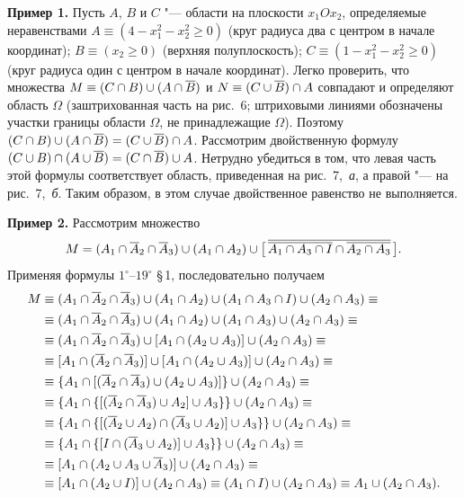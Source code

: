 {\small
\noindent\textbf{Пример 1.} Пусть $A$, $B$ и $C$ "--- области на
плоскости $x_1Ox_2$, определяемые неравенствами
$A\equiv(4-x_1^2-x_2^2\ge0)$ (круг радиуса два с центром в начале
координат); $B\equiv(x_2\ge0)$ (верхняя полуплоскость);
$C\equiv(1-x_1^2-x_2^2\ge0)$ (круг радиуса один с центром в начале
координат). Легко проверить, что множества
$M\equiv(C\cap B)\cup(A\cap\overline{B})$ и $N\equiv(C\cup\overline{B})\cap A$ совпадают
и определяют область $\Omega$ (заштрихованная часть на рис.~6;
штриховыми линиями обозначены участки границы области $\Omega$, не
принадлежащие $\Omega$). Поэтому $(C\cap B)\cup(A\cap\overline{B})=(C\cup\overline{B})\cap A$.
Рассмотрим двойственную формулу $(C\cup B)\cap(A\cup\overline{B})=(C\cap\overline{B})\cup A$.
Нетрудно убедиться в том, что левая часть этой формулы соответствует
область, приведенная на рис.~7,~\emph{а}, а правой "--- на рис.~7,~\emph{б}.
Таким образом, в этом случае двойственное равенство не выполняется.

\smallskip
\noindent\textbf{Пример 2.} Рассмотрим множество
\[
M=(A_1\cap\overline{A}_2\cap\overline{A}_3)\cup(A_1\cap A_2)\cup
\bigl[\,\overline{\overline{A_1\cap A_3\cap I}\cap\overline{A_2\cap A_3}}\,\bigr].
\]
Применяя формулы $1^\circ$--$19^\circ$ \S\,1, последовательно получаем
\begin{align*}
M&\equiv(A_1\cap\overline{A}_2\cap\overline{A}_3)\cup(A_1\cap A_2)\cup(A_1\cap A_3\cap I)\cup(A_2\cap A_3)\equiv\\
&\equiv(A_1\cap\overline{A}_2\cap\overline{A}_3)\cup(A_1\cap A_2)\cup(A_1\cap A_3)\cup(A_2\cap A_3)\equiv\\
&\equiv(A_1\cap\overline{A}_2\cap\overline{A}_3)\cup[A_1\cap(A_2\cup A_3)]\cup(A_2\cap A_3)\equiv\\
&\equiv[A_1\cap(\overline{A}_2\cap\overline{A}_3)]\cup[A_1\cap(A_2\cup A_3)]\cup(A_2\cap A_3)\equiv\\
&\equiv\{A_1\cap[(\overline{A}_2\cap\overline{A}_3)\cup(A_2\cup A_3)]\}\cup(A_2\cap A_3)\equiv\\
&\equiv\{A_1\cap\{[(\overline{A}_2\cap\overline{A}_3)\cup A_2]\cup A_3\}\}\cup(A_2\cap A_3)\equiv\\
&\equiv\{A_1\cap\{[(\overline{A}_2\cup A_2)\cap(\overline{A}_3\cup A_2)]\cup A_3\}\}\cup(A_2\cap A_3)\equiv\\
&\equiv\{A_1\cap\{[I\cap(\overline{A}_3\cup A_2)]\cup A_3\}\}\cup(A_2\cap A_3)\equiv\\
&\equiv[A_1\cap(A_2\cup A_3\cup\overline{A}_3)]\cup(A_2\cap A_3)\equiv\\
&\equiv[A_1\cap(A_2\cup I)]\cup(A_2\cap A_3)\equiv(A_1\cap I)\cup(A_2\cap A_3)\equiv A_1\cup(A_2\cap A_3).
\end{align*}
}

